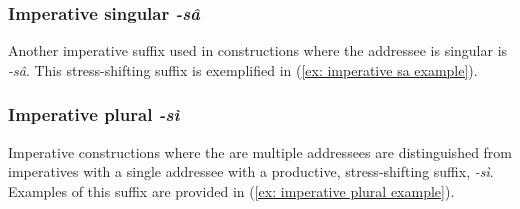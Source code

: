 \subsubsection{Imperative singular \textit{-sâ}}
\label{subsubsec: imperative singular sa}

Another imperative suffix used in constructions where the addressee is singular is \textit{-sâ}. This stress-shifting suffix is exemplified in (\ref{ex: imperative sa example}).

\ea\label{ex: imperative sa example}

    \z
\z

\subsubsection{Imperative plural \textit{-sì}}
\label{subsubsec: imperative plural}

Imperative constructions where the are multiple addressees are distinguished from imperatives with a single addressee with a productive, stress-shifting suffix, \textit{-sì}. Examples of this suffix are provided in (\ref{ex: imperative plural example}).

\ea\label{ex: imperative plural example}

    \z
\z

